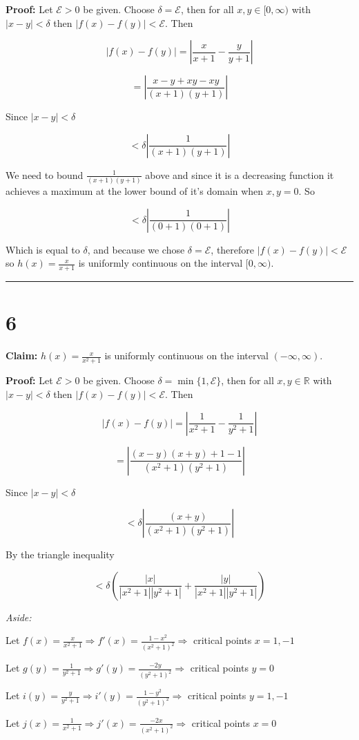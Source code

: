 \documentclass[10pt,letterpaper]{article}
\newcommand\R{\mathds{R}}
\newcommand\E{\mathcal{E}}
\newcommand\ds{\displaystyle}
\newcommand\qedsym{\hfill \rule{2mm}{2mm}}
\begin{document}
\medskip

\textbf{Proof:} Let $\E > 0$ be given. Choose $\delta = \E$, then for all $x,y\in[0,\infty)$ with $|x-y|<\delta$ then $|f(x)-f(y)| < \E$. Then

\[\left|f(x)-f(y)\right| = \left|\frac{x}{x+1}-\frac{y}{y+1}\right|\]

\[= \left|\frac{x-y+xy-xy}{(x+1)(y+1)}\right|\]

Since $|x-y|<\delta$

\[< \delta\left|\frac{1}{(x+1)(y+1)}\right|\]

We need to bound $\frac{1}{(x+1)(y+1)}$ above and since it is a decreasing function it achieves a maximum at the lower bound of it's domain when $x,y=0$. So

\[<\delta\left|\frac{1}{(0+1)(0+1)}\right|\]


Which is equal to $\delta$, and because we chose $\delta=\E$, therefore $\left|f(x)-f(y)\right|<\E$ so $h(x) = \frac{x}{x+1}$ is uniformly continuous on the interval $[0, \infty)$.

\qedsym

\section*{6}

\textbf{Claim:} $h(x) = \frac{x}{x^2+1}$ is uniformly continuous on the interval $(-\infty, \infty)$.

\medskip

\textbf{Proof:} Let $\E > 0$ be given. Choose $\delta = \min\{1, \E\}$, then for all $x,y\in\R$ with $|x-y|<\delta$ then $|f(x)-f(y)| < \E$. Then

\[|f(x) - f(y)| = \left|\frac{1}{x^2+1}-\frac{1}{y^2 + 1}\right|\]

\[= \left|\frac{(x-y)(x+y)+1-1}{(x^2+1)(y^2+1)}\right|\]

Since $|x-y|<\delta$

\[< \delta\left|\frac{(x+y)}{(x^2+1)(y^2+1)}\right|\]

By the triangle inequality

\[< \delta\left(\frac{|x|}{|x^2+1||y^2+1|}+\frac{|y|}{|x^2+1||y^2+1|}\right)\]

{\addtolength{\leftskip}{5mm}
\textit{Aside:}

Let $\ds f(x) = \frac{x}{x^2+1} \Rightarrow f'(x) = \frac{1-x^2}{{(x^2+1)}^2}\Rightarrow$ critical points $x=1,-1$

Let $\ds g(y) = \frac{1}{y^2+1} \Rightarrow g'(y) = \frac{-2y}{{(y^2+1)}^2}\Rightarrow$ critical points $y=0$

Let $\ds i(y) = \frac{y}{y^2+1} \Rightarrow i'(y) = \frac{1-y^2}{{(y^2+1)}^2}\Rightarrow$ critical points $y=1,-1$

Let $\ds j(x) = \frac{1}{x^2+1} \Rightarrow j'(x) = \frac{-2x}{{(x^2+1)}^2}\Rightarrow$ critical points $x=0$

}\medskip
\end{document}
